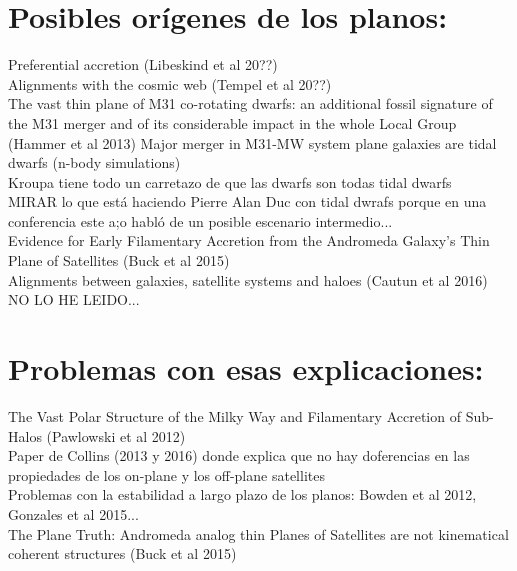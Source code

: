 \documentclass{article}
\begin{document}
\section{Posibles or\'igenes de los planos:}
\noindent Preferential accretion (Libeskind et al 20??)\\
Alignments with the cosmic web (Tempel et al 20??)\\
The vast thin plane of M31 co-rotating dwarfs: an additional fossil
signature of the M31 merger and of its considerable impact in the
whole Local Group (Hammer et al 2013) Major merger in M31-MW system
plane galaxies are tidal dwarfs (n-body simulations)\\
Kroupa tiene todo un carretazo de que las dwarfs son todas tidal
dwarfs\\
MIRAR lo que est\'a haciendo Pierre Alan Duc con tidal dwrafs porque en
una conferencia este a;o habl\'o de un posible escenario
intermedio...\\
Evidence for Early Filamentary Accretion from the Andromeda Galaxy's
Thin Plane of Satellites (Buck et al 2015)\\
Alignments between galaxies, satellite systems and haloes (Cautun et al
2016) NO LO HE LEIDO...



\section{Problemas con esas explicaciones:}
The Vast Polar Structure of the Milky Way and Filamentary Accretion of
Sub-Halos (Pawlowski et al 2012)\\
Paper de Collins (2013 y 2016) donde explica que no hay doferencias en
las propiedades de los on-plane y los off-plane satellites\\
Problemas con la estabilidad a largo plazo de los planos: Bowden et al
2012, Gonzales et al 2015...\\
The Plane Truth: Andromeda analog thin Planes of Satellites are not
kinematical coherent structures (Buck et al 2015)\\









  


 
\end{document}
